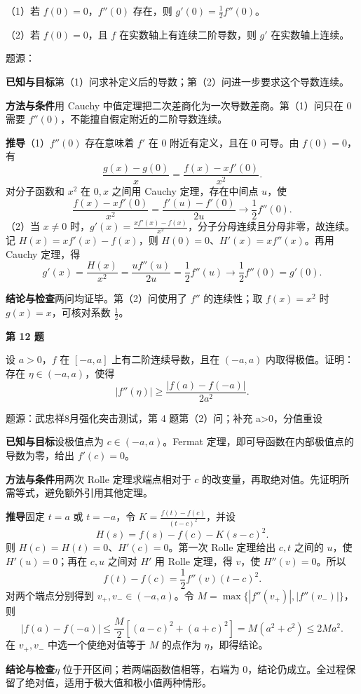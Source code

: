 \documentclass[UTF8,zihao=-4,fontset=fandol]{ctexart}
\newcommand{\Question}[4]{\clearpage\def\CurrentNumber{#1}\def\CurrentSource{#4}\pdfbookmark[1]{第#1题}{q#1}{\small\color{accent}模拟卷 2\hfill #2 · #3 分}\par{\Large\bfseries 第 #1 题}\par\medskip\fontsize{14}{22}\selectfont}
\newcommand{\Solution}{\clearpage\fontsize{12}{18}\selectfont{\large\bfseries 第 \CurrentNumber\ 题解析}\par{\footnotesize\color{gray}题源：\CurrentSource}\par\smallskip}
\newcommand{\Known}{\par\textbf{已知与目标}\quad}
\newcommand{\Method}{\par\textbf{方法与条件}\quad}
\newcommand{\Derive}{\par\textbf{推导}\quad}
\renewcommand{\Check}{\par\textbf{结论与检查}\quad}
\begin{document}
（1）若 $f(0)=0$，$f''(0)$ 存在，则 $g'(0)=\frac12f''(0)$。

（2）若 $f(0)=0$，且 $f$ 在实数轴上有连续二阶导数，则 $g'$ 在实数轴上连续。
\Solution
\Known 第（1）问求补定义后的导数；第（2）问进一步要求这个导数连续。
\Method 用 Cauchy 中值定理把二次差商化为一次导数差商。第（1）问只在 $0$ 需要 $f''(0)$，不能擅自假定附近的二阶导数连续。
\Derive （1）$f''(0)$ 存在意味着 $f'$ 在 $0$ 附近有定义，且在 $0$ 可导。由 $f(0)=0$，有
\[
\frac{g(x)-g(0)}x=\frac{f(x)-xf'(0)}{x^2}.
\]
对分子函数和 $x^2$ 在 $0,x$ 之间用 Cauchy 定理，存在中间点 $u$，使
\[
\frac{f(x)-xf'(0)}{x^2}=\frac{f'(u)-f'(0)}{2u}\to\frac12f''(0).
\]
（2）当 $x\ne0$ 时，$g'(x)=\frac{xf'(x)-f(x)}{x^2}$，分子分母连续且分母非零，故连续。记 $H(x)=xf'(x)-f(x)$，则 $H(0)=0$、$H'(x)=xf''(x)$。再用 Cauchy 定理，得
\[
g'(x)=\frac{H(x)}{x^2}=\frac{uf''(u)}{2u}=\frac12f''(u)\to\frac12f''(0)=g'(0).
\]
\Check 两问均证毕。第（2）问使用了 $f''$ 的连续性；取 $f(x)=x^2$ 时 $g(x)=x$，可核对系数 $\frac12$。

\Question{12}{解答}{15}{武忠祥8月强化突击测试，第 4 题第（2）问；补充 a>0，分值重设}
设 $a>0$，$f$ 在 $[-a,a]$ 上有二阶连续导数，且在 $(-a,a)$ 内取得极值。证明：存在 $\eta\in(-a,a)$，使得
\[
|f''(\eta)|\ge\frac{|f(a)-f(-a)|}{2a^2}.
\]
\Solution
\Known 设极值点为 $c\in(-a,a)$。Fermat 定理，即可导函数在内部极值点的导数为零，给出 $f'(c)=0$。
\Method 用两次 Rolle 定理求端点相对于 $c$ 的改变量，再取绝对值。先证明所需等式，避免额外引用其他定理。
\Derive 固定 $t=a$ 或 $t=-a$，令 $K=\frac{f(t)-f(c)}{(t-c)^2}$，并设
\[
H(s)=f(s)-f(c)-K(s-c)^2.
\]
则 $H(c)=H(t)=0$、$H'(c)=0$。第一次 Rolle 定理给出 $c,t$ 之间的 $u$，使 $H'(u)=0$；再在 $c,u$ 之间对 $H'$ 用 Rolle 定理，得 $v$，使 $H''(v)=0$。所以
\[
f(t)-f(c)=\frac12f''(v)(t-c)^2.
\]
对两个端点分别得到 $v_+,v_-\in(-a,a)$。令 $M=\max\{|f''(v_+)|,|f''(v_-)|\}$，则
\[
|f(a)-f(-a)|\le\frac M2[(a-c)^2+(a+c)^2]
=M(a^2+c^2)\le2Ma^2.
\]
在 $v_+,v_-$ 中选一个使绝对值等于 $M$ 的点作为 $\eta$，即得结论。
\Check $\eta$ 位于开区间；若两端函数值相等，右端为 $0$，结论仍成立。全过程保留了绝对值，适用于极大值和极小值两种情形。
\end{document}
